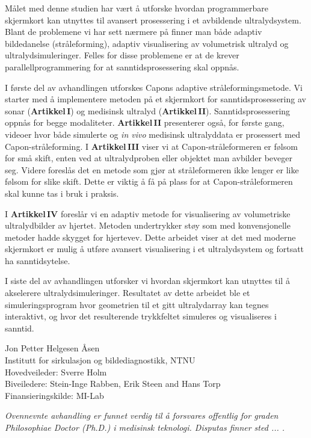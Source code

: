 \documentclass[10pt,b5paper,twoside]{book}
\begin{document}
Målet med denne studien har vært å utforske hvordan programmerbare skjermkort kan utnyttes til avansert prosessering i et avbildende ultralydsystem. Blant de problemene vi har sett nærmere på finner man både adaptiv bildedanelse (stråleforming), adaptiv visualisering av volumetrisk ultralyd og ultralydsimuleringer. Felles for disse problemene er at de krever parallellprogrammering for at sanntidsprosessering skal oppnås.

I første del av avhandlingen utforskes Capons adaptive stråleformingsmetode. Vi starter med å implementere metoden på et skjermkort for sanntidsprosessering av sonar (\textbf{Artikkel\,I}) og medisinsk ultralyd (\textbf{Artikkel\,II}). Sanntidsprosessering oppnås for begge modaliteter. \textbf{Artikkel\,II} presenterer også, for første gang, videoer hvor både simulerte og \textit{in vivo} medisinsk ultralyddata er prosessert med Capon-stråleforming. I \textbf{Artikkel\,III} viser vi at Capon-stråleformeren er følsom for små skift, enten ved at ultralydproben eller objektet man avbilder beveger seg. Videre foreslås det en metode som gjør at stråleformeren ikke lenger er like følsom for slike skift. Dette er viktig å få på plass for at Capon-stråleformeren skal kunne tas i bruk i praksis.

I \textbf{Artikkel\,IV} foreslår vi en adaptiv metode for visualisering av volumetriske ultralydbilder av hjertet. Metoden undertrykker støy som med konvensjonelle metoder hadde skygget for hjertevev. Dette arbeidet viser at det med moderne skjermkort er mulig å utføre avansert visualisering i et ultralydsystem og fortsatt ha sanntidsytelse.

I siste del av avhandlingen utforsker vi hvordan skjermkort kan utnyttes til å akselerere ultralydsimuleringer. Resultatet av dette arbeidet ble et simuleringsprogram hvor geometrien til et gitt ultralydarray kan tegnes interaktivt, og hvor det resulterende trykkfeltet simuleres og visualiseres i sanntid.

\vspace{0.3cm}
\noindent Jon Petter Helgesen \AA{}sen\\
Institutt for sirkulasjon og bildediagnostikk, NTNU\\
Hovedveileder: Sverre Holm\\ 
Biveiledere: Stein-Inge Rabben, Erik Steen and Hans Torp\\
Finansieringskilde: MI-Lab

\vspace{0.2cm}
\noindent \emph{Ovennevnte avhandling er funnet verdig til \aa{} forsvares offentlig for graden Philosophiae Doctor (Ph.D.) i medisinsk teknologi. Disputas finner sted ... .}
\end{document}
